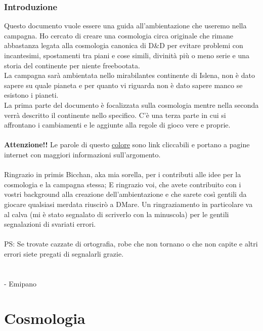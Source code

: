 \documentclass[10pt, a4paper]{report}
\newcommand{\partimagefile}{}
\newcommand{\partimage}[1]{%
	\renewcommand{\partimagefile}{#1}%
}
\begin{document}
\section{Introduzione}
Questo documento vuole essere una guida all'ambientazione che useremo nella campagna. Ho cercato di creare una cosmologia circa originale che rimane abbastanza legata alla cosmologia canonica di D\&D per evitare problemi con incantesimi, spostamenti tra piani e cose simili, divinità più o meno serie e una storia del continente per niente freebootata.\\
La campagna sarà ambientata nello mirabilantes continente di Islena, non è dato sapere su quale pianeta e per quanto vi riguarda non è dato sapere manco se esistono i pianeti. \\
La prima parte del documento è focalizzata sulla cosmologia mentre nella seconda verrà descritto il continente nello specifico. C'è una terza parte in cui si affrontano i cambiamenti e le aggiunte alla regole di gioco vere e proprie.\\
\\
\textbf{Attenzione!!} Le parole di questo \href{https://www.youtube.com/watch?v=xvFZjo5PgG0}{colore} sono link cliccabili e portano a pagine internet con maggiori informazioni sull'argomento.\\
\\
Ringrazio in primis Bicchan, aka mia sorella, per i contributi alle idee per la cosmologia e la campagna stessa; E ringrazio voi, che avete contribuito con i vostri background alla creazione dell'ambientazione e che sarete così gentili da giocare qualsiasi merdata riuscirò a DMare. Un ringraziamento in particolare va al calva (mi è stato segnalato di scriverlo con la minuscola) per le gentili segnalazioni di svariati errori.\\
\\
PS: Se trovate cazzate di ortografia, robe che non tornano o che non capite e altri errori siete pregati di segnalarli grazie.  \\
\\
\\
- Emipano

\partimage{cosmpart1.png}
\part{Cosmologia}
\end{document}
